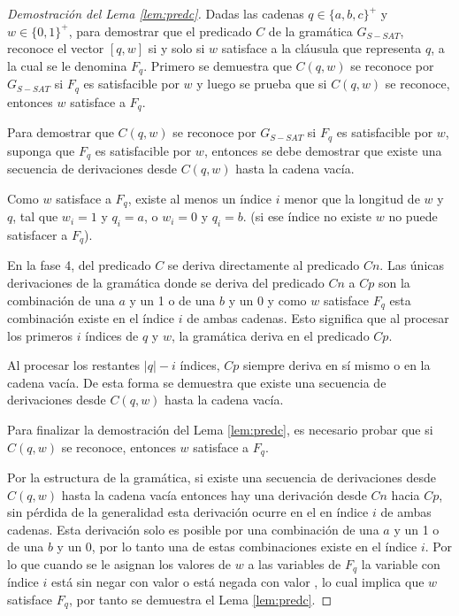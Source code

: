 \begin{proof}[Demostración del Lema \ref{lem:predc}]
    Dadas las cadenas $q\in \{a,b,c\}^+$ y $w\in \{0,1\}^+$, para demostrar que el predicado $C$ de la 
    gramática $G_{S-SAT}$, reconoce el vector $[q,w]$ si y solo si $w$ satisface a la cláusula que representa 
    $q$, a la cual se le denomina $F_q$. Primero se demuestra que $C(q,w)$ se reconoce por $G_{S-SAT}$ si $F_q$ es satisfacible por $w$ y 
    luego se prueba que si $C(q,w)$ se reconoce, entonces $w$ satisface a $F_q$.
    
    Para demostrar que $C(q,w)$ se reconoce por $G_{S-SAT}$ si $F_q$ es satisfacible por $w$, suponga que $F_q$ es satisfacible por $w$, entonces se debe demostrar que existe una secuencia de derivaciones desde $C(q,w)$ hasta la cadena vacía.
    
    Como $w$ satisface a $F_q$, existe al menos un índice $i$ menor que la longitud de $w$ y $q$, tal que $w_i=1$ y $q_i = a$, o $w_i=0$ y $q_i=b$. (si ese índice no existe $w$ no puede satisfacer a $F_q$).
    
    En la fase 4, del predicado $C$ se deriva directamente al predicado $Cn$. Las únicas derivaciones de la gramática donde se deriva del predicado $Cn$ a $Cp$ son la combinación de una $a$ y un 1 o de una $b$ y un 0 y como $w$ satisface $F_q$ esta combinación existe en el índice $i$ de ambas cadenas. Esto significa que al procesar los primeros $i$ índices de $q$ y $w$, la gramática deriva en el predicado $Cp$. 
    
    Al procesar los restantes $|q|-i$ índices, $Cp$ siempre deriva en sí mismo o en la cadena vacía. De esta forma se demuestra que existe una secuencia de derivaciones desde $C(q,w)$ hasta la cadena vacía.
    
    Para finalizar la demostración del Lema \ref{lem:predc}, es necesario probar que si $C(q,w)$ se reconoce, entonces $w$ satisface a $F_q$. 
    
    Por la estructura de la gramática, si existe una secuencia de derivaciones desde $C(q,w)$ hasta la cadena vacía entonces hay una derivación desde $Cn$ hacia $Cp$, sin pérdida de la generalidad esta derivación ocurre en el en índice $i$ de ambas cadenas. Esta derivación solo es posible por una combinación de una $a$ y un 1 o de una $b$ y un 0, por lo tanto una de estas combinaciones existe en el índice $i$. Por lo que cuando se le asignan los valores de $w$ a las variables de $F_q$ la variable con índice $i$ está
    sin negar con valor \true{} o está negada con valor \false{}, lo cual implica que $w$ satisface $F_q$, por tanto se demuestra el Lema \ref{lem:predc}.
\end{proof}

